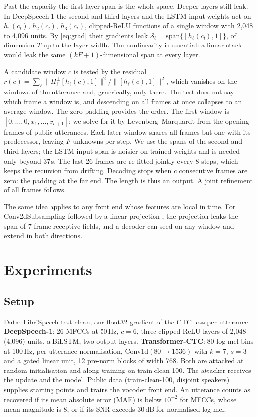 \documentclass{Interspeech}
\begin{document}
Past the capacity the first-layer span is the whole space. Deeper layers still leak. In DeepSpeech-1
the second and third layers and the LSTM input weights act on $h_1(c_t)$, $h_2(c_t)$, $h_3(c_t)$,
clipped-ReLU functions of a single window with 2{,}048 to 4{,}096 units. By \eqref{eq:grad} their
gradients leak $\mathcal{S}_\ell=\mathrm{span}\{[h_\ell(c_t),1]\}$, of dimension $T$ up to the layer
width. The nonlinearity is essential: a linear stack would leak the same $(kF{+}1)$-dimensional span at
every layer.

A candidate window $c$ is tested by the residual
$r(c)=\sum_\ell\lVert\Pi_\ell^{\perp}[h_\ell(c),1]\rVert^2/\lVert[h_\ell(c),1]\rVert^2$, which vanishes on the windows
of the utterance and, generically, only there. The test does not say which frame a window is, and
descending on all frames at once collapses to an average window. The zero padding provides the order.
The first window is $[0,\dots,0,x_1,\dots,x_{c+1}]$; we solve for it by Levenberg--Marquardt from the
opening frames of public utterances. Each later window shares all frames but one with its predecessor,
leaving $F$ unknowns per step. We use the spans of the second and third layers; the LSTM-input span is noisier on trained weights and is
needed only beyond 37\,s. The last 26 frames are re-fitted jointly every 8 steps, which keeps the
recursion from drifting. Decoding stops when $c$ consecutive frames are zero: the
padding at the far end. The length is thus an output. A joint refinement of all frames follows.

The same idea applies to any front end whose features are local in time. For Conv2dSubsampling followed
by a linear projection \cite{gulati2020conformer}, the projection leaks the span of 7-frame receptive
fields, and a decoder can seed on any window and extend in both directions.

\section{Experiments}

\subsection{Setup}
Data: LibriSpeech \cite{panayotov2015librispeech} test-clean; one float32 gradient of the CTC loss per
utterance. \textbf{DeepSpeech-1}: 26 MFCCs at 50\,Hz, $c=6$, three clipped-ReLU layers of 2{,}048
(4{,}096) units, a BiLSTM, two output layers. \textbf{Transformer-CTC}: 80 log-mel bins at 100\,Hz,
per-utterance normalisation, Conv1d$(80{\to}1536)$ with $k{=}7$, $s{=}3$ and a gated linear unit, 12
pre-norm blocks of width 768. Both are attacked at random initialisation and along training on
train-clean-100. The attacker receives the update and the model. Public data (train-clean-100, disjoint
speakers) supplies starting points and trains the vocoder front end. An utterance counts as recovered if
its mean absolute error (MAE) is below $10^{-2}$ for MFCCs, whose mean magnitude is 8, or if its SNR
exceeds 30\,dB for normalised log-mel.
\end{document}
